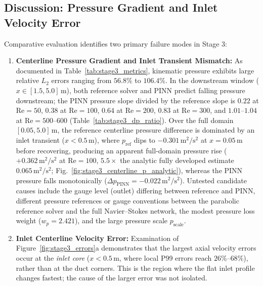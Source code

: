 \documentclass[11pt,a4paper]{article}
\begin{document}
\subsection{Discussion: Pressure Gradient and Inlet Velocity Error}
Comparative evaluation identifies two primary failure modes in Stage 3:
\begin{enumerate}[leftmargin=1.5em]
    \item \textbf{Centerline Pressure Gradient and Inlet Transient Mismatch:} As documented in Table~\ref{tab:stage3_metrics}, kinematic pressure exhibits large relative $L_2$ errors ranging from $\mathbf{56.8\%}$ to $\mathbf{106.4\%}$. In the downstream window ($x \in [1.5, 5.0]\,\text{m}$), both reference solver and PINN predict falling pressure downstream; the PINN pressure slope divided by the reference slope is $0.22$ at $\mathrm{Re}=50$, $0.38$ at $\mathrm{Re}=100$, $0.64$ at $\mathrm{Re}=200$, $0.83$ at $\mathrm{Re}=300$, and $1.01$--$1.04$ at $\mathrm{Re}=500$--$600$ (Table~\ref{tab:stage3_dp_ratio}). Over the full domain $[0.05, 5.0]\,\text{m}$, the reference centerline pressure difference is dominated by an inlet transient ($x < 0.5\,\text{m}$), where $p_{\mathrm{ref}}$ dips to $-0.301\,\mathrm{m^2/s^2}$ at $x=0.05\,\text{m}$ before recovering, producing an apparent full-domain pressure rise ($+0.362\,\mathrm{m^2/s^2}$ at $\mathrm{Re}=100$, $5.5\times$ the analytic fully developed estimate $0.065\,\mathrm{m^2/s^2}$; Fig.~\ref{fig:stage3_centerline_p_analytic}), whereas the PINN pressure falls monotonically ($\Delta p_{\mathrm{PINN}} = -0.022\,\mathrm{m^2/s^2}$). Untested candidate causes include the gauge level (outlet) differing between reference and PINN, different pressure references or gauge conventions between the parabolic reference solver and the full Navier--Stokes network, the modest pressure loss weight ($w_p = 2.421$), and the large pressure scale $p_{\mathrm{scale}}$.
    \item \textbf{Inlet Centerline Velocity Error:} Examination of Figure~\ref{fig:stage3_errors}a demonstrates that the largest axial velocity errors occur at the \textit{inlet core} ($x < 0.5\,\text{m}$, where local P99 errors reach $26\%$--$68\%$), rather than at the duct corners. This is the region where the flat inlet profile changes fastest; the cause of the larger error was not isolated.
\end{enumerate}
\end{document}
